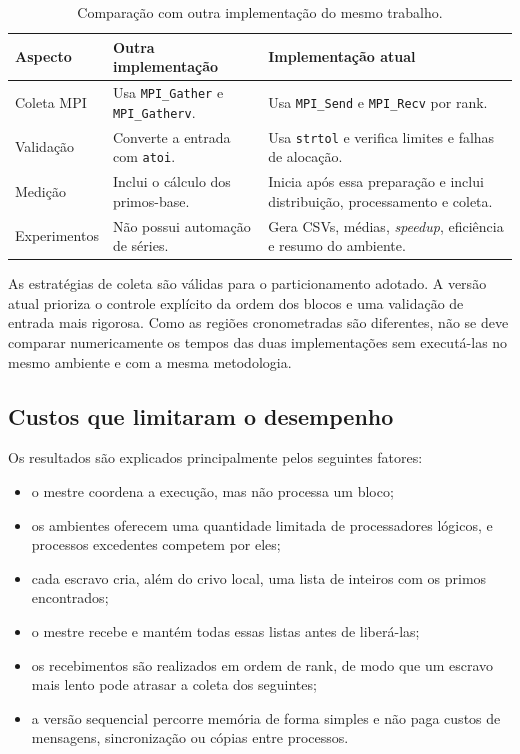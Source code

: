 \documentclass[12pt,a4paper]{article}
\begin{document}
\begin{table}[ht]
    \centering
    \caption{Comparação com outra implementação do mesmo trabalho.}
    \label{tab:comparacao-referencia}
    \begin{tabular}{p{}p{}p{}}
        \toprule
        \textbf{Aspecto} & \textbf{Outra implementação} & \textbf{Implementação atual} \\
        \midrule
        Coleta MPI & Usa \texttt{MPI\_Gather} e \texttt{MPI\_Gatherv}. & Usa \texttt{MPI\_Send} e \texttt{MPI\_Recv} por rank. \\
        Validação & Converte a entrada com \texttt{atoi}. & Usa \texttt{strtol} e verifica limites e falhas de alocação. \\
        Medição & Inclui o cálculo dos primos-base. & Inicia após essa preparação e inclui distribuição, processamento e coleta. \\
        Experimentos & Não possui automação de séries. & Gera CSVs, médias, \textit{speedup}, eficiência e resumo do ambiente. \\
        \bottomrule
    \end{tabular}
\end{table}

As estratégias de coleta são válidas para o particionamento adotado. A versão
atual prioriza o controle explícito da ordem dos blocos e uma validação de
entrada mais rigorosa. Como as regiões cronometradas são diferentes, não se
deve comparar numericamente os tempos das duas implementações sem executá-las
no mesmo ambiente e com a mesma metodologia.

\subsection{Custos que limitaram o desempenho}

Os resultados são explicados principalmente pelos seguintes fatores:

\begin{itemize}
    \item o mestre coordena a execução, mas não processa um bloco;
    \item os ambientes oferecem uma quantidade limitada de processadores
          lógicos, e processos excedentes competem por eles;
    \item cada escravo cria, além do crivo local, uma lista de inteiros com os
          primos encontrados;
    \item o mestre recebe e mantém todas essas listas antes de liberá-las;
    \item os recebimentos são realizados em ordem de rank, de modo que um
          escravo mais lento pode atrasar a coleta dos seguintes;
    \item a versão sequencial percorre memória de forma simples e não paga
          custos de mensagens, sincronização ou cópias entre processos.
\end{itemize}
\end{document}
